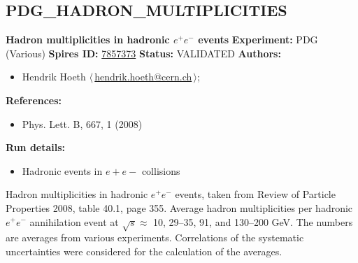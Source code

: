 \clearpage


\clearpage

\subsection[PDG\_HADRON\_MULTIPLICITIES]{PDG\_HADRON\_MULTIPLICITIES\,\cite{Amsler:2008zzb}}
\textbf{Hadron multiplicities in hadronic $e^+e^-$ events}\newline
\textbf{Experiment:} PDG (Various) \newline
\textbf{Spires ID:} \href{http://www.slac.stanford.edu/spires/find/hep/www?rawcmd=key+7857373}{7857373}\newline
\textbf{Status:} VALIDATED\newline
\textbf{Authors:}
\begin{itemize}
  \item Hendrik Hoeth $\langle\,$\href{mailto:hendrik.hoeth@cern.ch}{hendrik.hoeth@cern.ch}$\,\rangle$;
\end{itemize}
\textbf{References:}
\begin{itemize}
  \item Phys. Lett. B, 667, 1 (2008)
\end{itemize}
\textbf{Run details:}
\begin{itemize}

  \item Hadronic events in $e+e-$ collisions\end{itemize}

\noindent Hadron multiplicities in hadronic $e^+e^-$ events, taken from Review of Particle Properties 2008, table 40.1, page 355.   Average hadron multiplicities per hadronic $e^+e^-$ annihilation event at $\sqrt{s} \approx {}$ 10, 29--35, 91, and 130--200 GeV. The numbers are averages from various experiments. Correlations of the systematic uncertainties were considered for the calculation of the averages.

\clearpage


\clearpage

